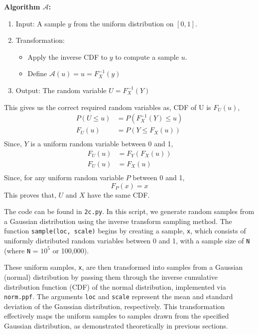 \begin{solution}
	\textbf{Algorithm $\mathcal{A}$:}
	\begin{enumerate}
		\item Input: A sample $y$ from the uniform distribution on $[0,1]$.
		\item Transformation:
		      \begin{itemize}
			      \item Apply the inverse CDF to $y$ to compute a sample $u$.
			      \item Define $\mathcal{A}(u) = u = F_X^{-1}(y)$
		      \end{itemize}
		\item Output: The random variable $U = F_X^{-1}(Y)$
	\end{enumerate}

	This gives us the correct required random variables as, CDF of U is $F_U(u)$,
	\begin{align}
		P(U\leq u ) & = P(F_X^{-1}(Y) \leq u)            \\
		F_U(u)      & =  P(Y \leq F_X(u)) \\
	\end{align}
	Since, $Y$ is a uniform random variable between 0 and 1,
	\begin{align}
		F_U(u)      & =  F_Y(F_X(u))                \\
		F_U(u)      & =  F_X(u)                     \\
	\end{align}
	Since, for any uniform random variable $P$ between 0 and 1,
	\[F_P(x) = x\]
	This proves that, $U$ and $X$ have the same CDF.

	The code can be found in \texttt{2c.py}. In this script, we generate random samples from a Gaussian distribution using the inverse transform sampling method. The function \texttt{sample(loc, scale)} begins by creating a sample, \texttt{x}, which consists of uniformly distributed random variables between 0 and 1, with a sample size of \texttt{N} (where \texttt{N} = $10^5$ or 100,000).

	These uniform samples, \texttt{x}, are then transformed into samples from a Gaussian (normal) distribution by passing them through the inverse cumulative distribution function (CDF) of the normal distribution, implemented via \texttt{norm.ppf}. The arguments \texttt{loc} and \texttt{scale} represent the mean and standard deviation of the Gaussian distribution, respectively. This transformation effectively maps the uniform samples to samples drawn from the specified Gaussian distribution, as demonstrated theoretically in previous sections.


\end{solution}
